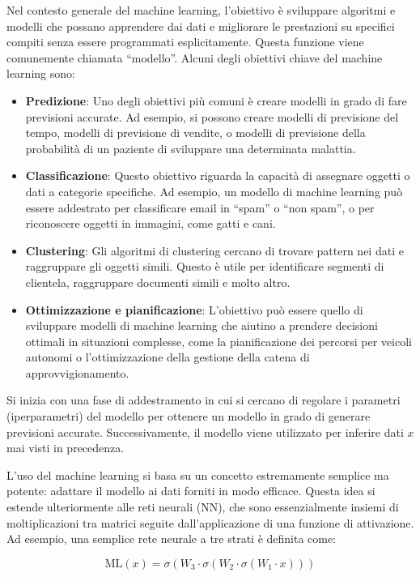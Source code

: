 Nel contesto generale del machine learning, l'obiettivo è sviluppare algoritmi e modelli che possano apprendere dai dati e migliorare le prestazioni su specifici compiti senza essere programmati esplicitamente. Questa funzione viene comunemente chiamata ``modello''. Alcuni degli obiettivi chiave del machine learning sono:

\begin{itemize}
    \item \textbf{Predizione}: Uno degli obiettivi più comuni è creare modelli in grado di fare previsioni accurate. Ad esempio, si possono creare modelli di previsione del tempo, modelli di previsione di vendite, o modelli di previsione della probabilità di un paziente di sviluppare una determinata malattia.
    \item \textbf{Classificazione}: Questo obiettivo riguarda la capacità di assegnare oggetti o dati a categorie specifiche. Ad esempio, un modello di machine learning può essere addestrato per classificare email in ``spam'' o ``non spam'', o per riconoscere oggetti in immagini, come gatti e cani.
    \item \textbf{Clustering}: Gli algoritmi di clustering cercano di trovare pattern nei dati e raggruppare gli oggetti simili. Questo è utile per identificare segmenti di clientela, raggruppare documenti simili e molto altro.
    \item \textbf{Ottimizzazione e pianificazione}: L'obiettivo può essere quello di sviluppare modelli di machine learning che aiutino a prendere decisioni ottimali in situazioni complesse, come la pianificazione dei percorsi per veicoli autonomi o l'ottimizzazione della gestione della catena di approvvigionamento.
\end{itemize}

Si inizia con una fase di addestramento in cui si cercano di regolare i 
parametri (iperparametri) del modello per ottenere un modello in grado di 
generare previsioni accurate. Successivamente, il modello viene utilizzato 
per inferire dati $x$ mai visti in precedenza.

L'uso del machine learning si basa su un concetto estremamente semplice ma potente: adattare il modello ai dati forniti in 
modo efficace. Questa idea si estende ulteriormente alle reti neurali (NN), 
che sono essenzialmente insiemi di moltiplicazioni tra matrici seguite 
dall'applicazione di una funzione di attivazione. Ad esempio, una 
semplice rete neurale a tre strati è definita come:

$$\mathrm{ML}(x) = \sigma(W_3 \cdot \sigma(W_2 \cdot \sigma(W_1 \cdot x)))$$

